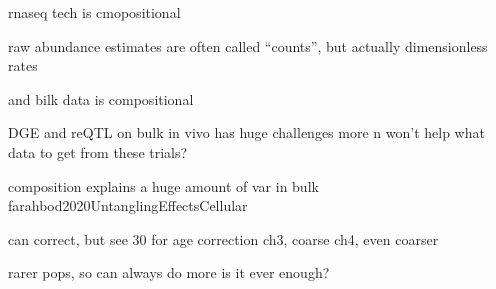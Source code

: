 \begin{outline}
rnaseq tech is cmopositional

raw abundance estimates are often called \enquote{counts}, but actually dimensionless rates

%

%

and bilk data is compositional


DGE and reQTL on bulk in vivo has huge challenges
more n won't help
what data to get from these trials?

    composition explains a huge amount of var in bulk farahbod2020UntanglingEffectsCellular

    can correct, but see 30 for age correction
        ch3, coarse
        ch4, even coarser

        rarer pops, so can always do more
        is it ever enough?


\end{outline}
